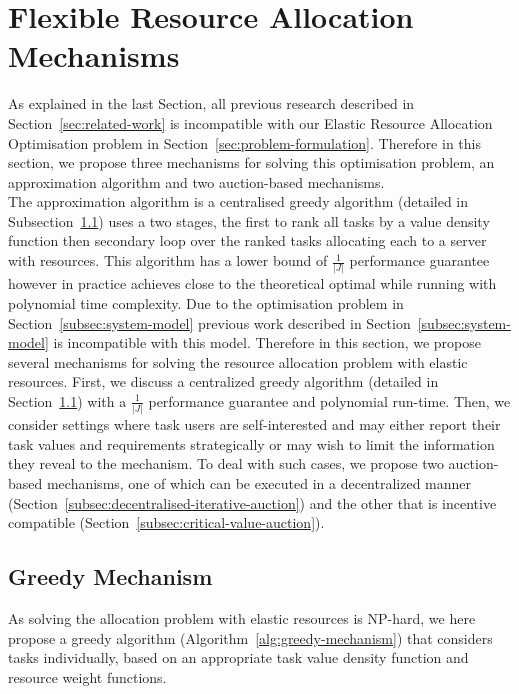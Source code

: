 \section{Flexible Resource Allocation Mechanisms}
\label{sec:flexible-resource-allocation-mechanisms}

As explained in the last Section, all previous research described in Section~\ref{sec:related-work} is incompatible
with our Elastic Resource Allocation Optimisation problem in Section~\ref{sec:problem-formulation}. Therefore in this
section, we propose three mechanisms for solving this optimisation problem, an approximation algorithm and two
auction-based mechanisms. \\
The approximation algorithm is a centralised greedy algorithm (detailed in Subsection~\ref{subsec:greedy-mechanism})
uses a two stages, the first to rank all tasks by a value density function then secondary loop over the ranked tasks
allocating each to a server with resources. This algorithm has a lower bound of $\frac{1}{\left|J\right|}$ performance
guarantee however in practice achieves close to the theoretical optimal while running with polynomial time complexity.
Due to the optimisation problem in Section~\ref{subsec:system-model} previous work described in
Section~\ref{subsec:system-model} is incompatible with this model. Therefore in this section, we propose several
mechanisms for solving the resource allocation problem with elastic resources. First, we discuss a centralized greedy
algorithm (detailed in Section~\ref{subsec:greedy-mechanism}) with a $\frac{1}{\left|J\right|}$ performance guarantee
and polynomial run-time. Then, we consider settings where task users are self-interested and may either report their
task values and requirements strategically or may wish to limit the information they reveal to the mechanism. To deal
with such cases, we propose two auction-based mechanisms, one of which can be executed in a decentralized manner
(Section~\ref{subsec:decentralised-iterative-auction}) and the other that is incentive compatible
(Section~\ref{subsec:critical-value-auction}).

\subsection{Greedy Mechanism}
\label{subsec:greedy-mechanism}
As solving the allocation problem with elastic resources is NP-hard, we here propose a greedy algorithm
(Algorithm~\ref{alg:greedy-mechanism}) that considers tasks individually, based on an appropriate task value density
function and resource weight functions.

